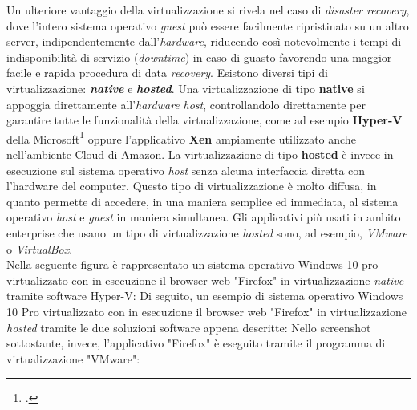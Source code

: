 Un ulteriore vantaggio della virtualizzazione si rivela nel caso di \textit{\gls{disaster recovery}}, dove l'intero sistema operativo \textit{guest} può essere facilmente ripristinato su un altro server, indipendentemente dall'\textit{hardware}, riducendo così notevolmente i tempi di indisponibilità di servizio (\textit{downtime}) in caso di guasto favorendo una maggior facile e rapida procedura di data \textit{\gls{recovery}}.
Esistono diversi tipi di virtualizzazione: \textbf{\textit{native}} e \textbf{\textit{hosted}}.
Una virtualizzazione di tipo \textbf{native} si appoggia direttamente all'\textit{hardware} \textit{host}, controllandolo direttamente per garantire tutte le funzionalità della virtualizzazione, come ad esempio \textbf{\gls{Hyper-V}} della Microsoft\footcite{questa funzionalita' e' presente solamente nelle versioni Pro e Server di Windows 10} oppure l'applicativo \textbf{\gls{Xen}} ampiamente utilizzato anche nell'ambiente Cloud di Amazon.
La virtualizzazione di tipo \textbf{hosted} è invece in esecuzione sul sistema operativo \textit{host} senza alcuna interfaccia diretta con l'hardware del computer. Questo tipo di virtualizzazione è molto diffusa, in quanto permette di accedere, in una maniera semplice ed immediata, al sistema operativo \textit{host} e \textit{guest} in maniera simultanea. Gli applicativi più usati in ambito enterprise che usano un tipo di virtualizzazione \textit{hosted} sono, ad esempio, \textit{VMware} o \textit{VirtualBox}.\\
Nella seguente figura è rappresentato un sistema operativo Windows 10 pro virtualizzato con in esecuzione il browser web "Firefox" in virtualizzazione \textit{native} tramite software Hyper-V:
Di seguito, un esempio di sistema operativo Windows 10 Pro virtualizzato con in esecuzione il browser web "Firefox" in virtualizzazione \textit{hosted} tramite le due soluzioni software appena descritte:
Nello screenshot sottostante, invece, l'applicativo "Firefox" è eseguito tramite il programma di virtualizzazione "VMware":


